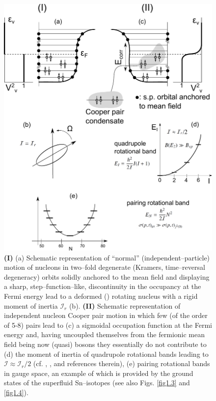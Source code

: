  
\begin{figure}
\centerline{\includegraphics*[width=\textwidth,angle=0]{nutshell/figs/fig1A3.pdf}}
\caption{\textbf{(I)} (a) Schematic representation of ``normal'' (independent--particle) motion of nucleons in  two--fold degenerate (Kramers, time--reversal degeneracy) orbits solidly anchored to the mean field and  displaying a sharp, step--function--like, discontinuity in the occupancy at the Fermi energy  lead to a deformed  (\cite{Nilsson:55}) rotating nucleus with a rigid moment of inertia $\mathcal{I}_r$ (b). \textbf{(II)} Schematic representation of independent nucleon Cooper pair  motion in which few (of the order of 5-8) pairs lead to (c) a sigmoidal occupation function at the Fermi energy and, having uncoupled themselves from the fermionic mean field being now (quasi) bosons they essentially do not  contribute to (d) the moment of inertia of quadrupole rotational bands leading to $\mathcal{I}\approx\mathcal{I}_r/2$ (cf. \cite{Belyaev:13}, \cite{Belyaev:59}, \cite{Bohr:75} and references therein), (e) pairing rotational bands in gauge space, an example of which is  provided by the ground states of the superfluid Sn--isotopes (see also Figs. \ref{fig1.3} and \ref{fig1.4}).}\label{fig1A3}
\end{figure}
